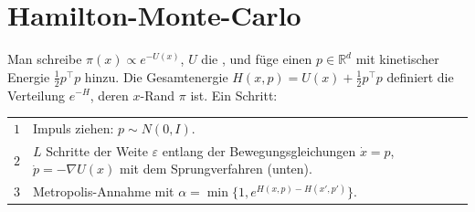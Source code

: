 \section{Hamilton-Monte-Carlo}

\begin{definition}
Man schreibe $\pi(x) \propto e^{-U(x)}$, $U$ die , und füge einen  $p\in\mathbb R^d$ mit kinetischer Energie $\tfrac12 p^{\top}p$ hinzu. Die Gesamtenergie $H(x,p) = U(x)+\tfrac12 p^{\top}p$ definiert die Verteilung $e^{-H}$, deren $x$-Rand $\pi$ ist. Ein Schritt:
\begin{center}
{\small
\renewcommand{\arraystretch}{1.5}
\begin{tabular}{@{}P{0.8cm}P{7.6cm}@{}}
\toprule
$1$ & Impuls ziehen: $p\sim N(0,I)$.\\
$2$ & $L$ Schritte der Weite $\varepsilon$ entlang der Bewegungsgleichungen $\dot x = p$, $\dot p = -\nabla U(x)$ mit dem Sprungverfahren (unten).\\
$3$ & Metropolis-Annahme mit $\alpha = \min\{1, e^{H(x,p) - H(x',p')}\}$.\\
\bottomrule
\end{tabular}}
\end{center}
\end{definition}

